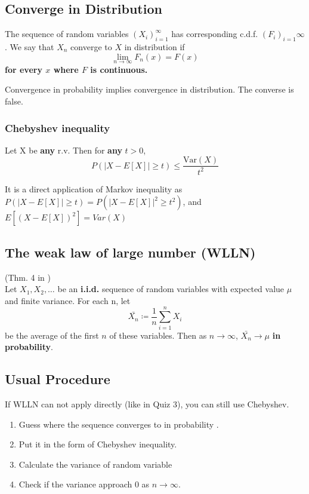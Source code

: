 \subsection*{Converge in Distribution}
The sequence of random variables \((X_i)_{i=1}^\infty\) has corresponding c.d.f. \((F_i)_{i=1}\infty  \).  We say that \(X_n\) converge to \(X\) in distribution if     
\[
    \lim\limits_{n \to \infty} F_n(x)  = F(x)
\]    
\textbf{for every \(x\) where \(F\)  is continuous.}  

\begin{remark}
 Convergence in probability implies convergence in distribution. The converse is false. 
\end{remark}
\subsubsection*{Chebyshev inequality}
\begin{note}
   Let X be \textbf{any} r.v. Then for \textbf{any} \(t > 0\),
   \[
    P(|X - E[X]| \geq t) \leq \frac{\text{Var} (X)}{t^2}
   \]  
\end{note}
It is a direct application of Markov inequality as \( P(|X - E[X]| \geq t) = P(|X - E[X]|^2 \geq t^2) \), and \(E[(X - E[X])^2] = Var(X)\) 
\subsection*{The weak law of large number (WLLN)}
\begin{theorem} 
    (Thm. 4 in \cite{Und_Chatterjee})\\
    Let \(X_1,X_2, \dots\) be an \textbf{i.i.d.} sequence of random variables with expected value \(\mu \) and finite variance. For each n, let 
    \[
        \bar{X_n} \coloneqq \frac{1}{n} \sum_{i=1}^{n} X_{i} 
    \]   
    be the average of the first \(n\) of these variables. Then as \(n \to \infty \), \(\bar{X_n} \to  \mu \) \textbf{in probability}.    
\end{theorem}
\subsection*{Usual Procedure}
If WLLN can not apply directly (like in Quiz 3), you can still use Chebyshev. 
\begin{enumerate}
    \item Guess where the sequence converges to in probability . 
    \item Put it in the form of Chebyshev inequality. 
    \item Calculate the variance of random variable
    \item Check if the variance approach 0 as \(n \to  \infty \).  
\end{enumerate}

